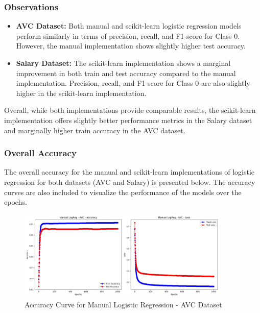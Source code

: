 \documentclass[a4paper,12pt]{article}
\begin{document}
\subsubsection{Observations}
\begin{itemize}
    \item \textbf{AVC Dataset:} Both manual and scikit-learn logistic regression models perform similarly in terms of precision, recall, and F1-score for Class 0. However, the manual implementation shows slightly higher test accuracy.
    \item \textbf{Salary Dataset:} The scikit-learn implementation shows a marginal improvement in both train and test accuracy compared to the manual implementation. Precision, recall, and F1-score for Class 0 are also slightly higher in the scikit-learn implementation.
\end{itemize}

Overall, while both implementations provide comparable results, the scikit-learn implementation offers slightly better performance metrics in the Salary dataset and marginally higher train accuracy in the AVC dataset.

\subsubsection{Overall Accuracy}

The overall accuracy for the manual and scikit-learn implementations of logistic regression for both datasets (AVC and Salary) is presented below. The accuracy curves are also included to visualize the performance of the models over the epochs.

\begin{figure}[H]
    \centering
    \includegraphics[width=0.9\textwidth]{Resources/logreg_curve_avc.jpeg}
    \caption{Accuracy Curve for Manual Logistic Regression - AVC Dataset}
    \label{fig:logreg_curve_avc}
\end{figure}
\end{document}
